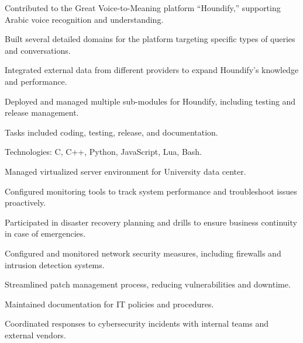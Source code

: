 \begin{resume_list}
    \item Contributed to the Great Voice-to-Meaning platform “Houndify,” supporting Arabic voice recognition and understanding.
    \item Built several detailed domains for the platform targeting specific types of queries and conversations.
    \item Integrated external data from different providers to expand Houndify's knowledge and performance.
    \item Deployed and managed multiple sub-modules for Houndify, including testing and release management.
    \item Tasks included coding, testing, release, and documentation.
    \item Technologies: C, C++, Python, JavaScript, Lua, Bash.
\end{resume_list}

\begin{resume_list}
    \item Managed virtualized server environment for University data center.
    \item Configured monitoring tools to track system performance and troubleshoot issues proactively.
    \item Participated in disaster recovery planning and drills to ensure business continuity in case of emergencies.
    \item Configured and monitored network security measures, including firewalls and intrusion detection systems.
    \item Streamlined patch management process, reducing vulnerabilities and downtime.
    \item Maintained documentation for IT policies and procedures.
    \item Coordinated responses to cybersecurity incidents with internal teams and external vendors.
\end{resume_list}